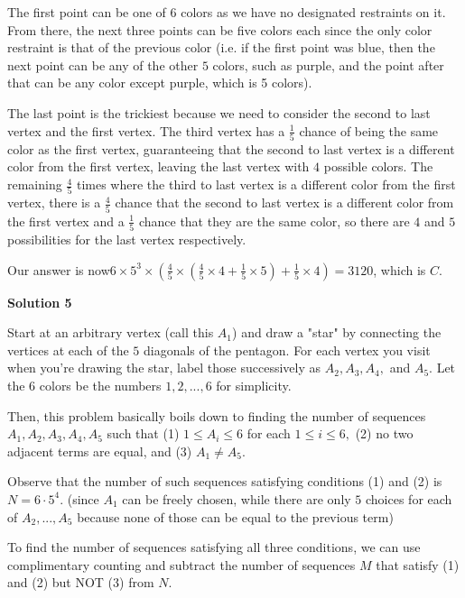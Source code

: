 \begin{enumerate}
 The first point can be one of $6$ colors as we have no designated restraints on it. From there, the next three points can be five colors each since the only color restraint is that of the previous color (i.e. if the first point was blue, then the next point can be any of the other $5$ colors, such as purple, and the point after that can be any color except purple, which is 5 colors). 

 The last point is the trickiest because we need to consider the second to last vertex and the first vertex. The third vertex has a $\frac{1}{5}$ chance of being the same color as the first vertex, guaranteeing that the second to last vertex is a different color from the first vertex, leaving the last vertex with $4$ possible colors. The remaining $\frac{4}{5}$ times where the third to last vertex is a different color from the first vertex, there is a $\frac{4}{5}$ chance that the second to last vertex is a different color from the first vertex and a $\frac{1}{5}$ chance that they are the same color, so there are $4$ and $5$ possibilities for the last vertex respectively. 

 Our answer is now$6\times5^3\times(\frac{4}{5}\times(\frac{4}{5}\times4+\frac{1}{5}\times5)+\frac{1}{5}\times4)=3120$, which is $\boxed{C}$.

 



\textbf{Solution 5}

Start at an arbitrary vertex (call this $A_1$) and draw a "star" by connecting the vertices at each of the $5$ diagonals of the pentagon. For each vertex you visit when you're drawing the star, label those successively as $A_2, A_3, A_4,$ and $A_5.$ Let the $6$ colors be the numbers $1, 2, ..., 6$ for simplicity. 

 Then, this problem basically boils down to finding the number of sequences $A_1, A_2, A_3, A_4, A_5$ such that (1) $1 \leq A_i \leq 6$ for each $1 \leq i \leq 6,$ (2) no two adjacent terms are equal, and (3) $A_1 \neq A_5.$

 Observe that the number of such sequences satisfying conditions (1) and (2) is $N = 6 \cdot 5^4.$ (since $A_1$ can be freely chosen, while there are only $5$ choices for each of $A_2, ..., A_5$ because none of those can be equal to the previous term) 

 To find the number of sequences satisfying all three conditions, we can use complimentary counting and subtract the number of sequences $M$ that satisfy (1) and (2) but NOT (3) from $N.$


\end{enumerate}
